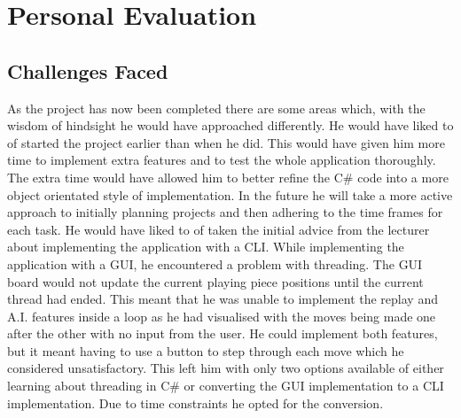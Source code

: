 \documentclass[10pt, a4paper]{article}
\begin{document}
 
 \section{Personal Evaluation}
 \subsection{Challenges Faced}
 As the project has now been completed there are some areas which, with the wisdom of hindsight he would have approached differently. 
 \newline 
 He would have liked to of started the project earlier than when he did. This would have given him more time to implement extra features and to test the whole application thoroughly. The extra time would have allowed him to better refine the C\# code into a more object orientated style of implementation. In the future he will take a more active approach to initially planning projects and then adhering to the time frames for each task.
 \newline
 He would have liked to of taken the initial advice from the lecturer about implementing the application with a CLI. While implementing the application with a GUI, he encountered a problem with threading. The GUI board would not update the current playing piece positions until the current thread had ended. This meant that he was unable to implement the replay and A.I. features inside a loop as he had visualised with the moves being made one after the other with no input from the user. He could implement both features, but it meant having to use a button to step through each move which he considered unsatisfactory. This left him with only two options available of either learning about threading in C\# or converting the GUI implementation to a CLI implementation. Due to time constraints he opted for the conversion.
 \newline
 
\end{document}
